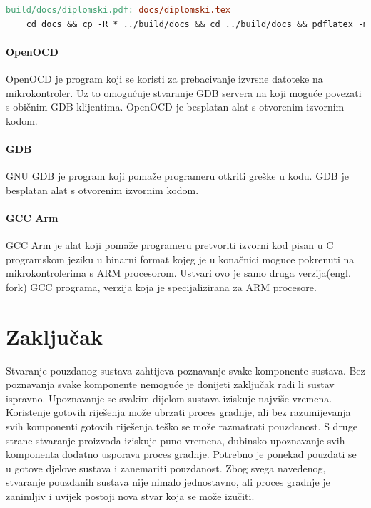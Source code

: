 \documentclass[times, utf8, diplomski]{diplomski}
\begin{document}
\begin{lstlisting}[language=make, label={lst:make}, caption={Gradnja dokumentacije korištenjem make recepta}]
build/docs/diplomski.pdf: docs/diplomski.tex
	cd docs && cp -R * ../build/docs && cd ../build/docs && pdflatex -mltex diplomski.tex && bibtex diplomski && pdflatex -mltex diplomski.tex
\end{lstlisting}

\subsubsection{OpenOCD}
OpenOCD \cite{openocd} je program koji se koristi za prebacivanje izvrsne datoteke na mikrokontroler. Uz to omogućuje stvaranje GDB servera na koji moguće povezati s običnim GDB klijentima. OpenOCD je besplatan alat s otvorenim izvornim kodom.

\subsubsection{GDB}
GNU GDB \cite{gdb} je program koji pomaže programeru otkriti greške u kodu. GDB je besplatan alat s otvorenim izvornim kodom.

\subsubsection{GCC Arm}
GCC Arm \cite{armgcc} je alat koji pomaže programeru pretvoriti izvorni kod pisan u C programskom jeziku u binarni format kojeg je u konačnici moguce pokrenuti na mikrokontrolerima s ARM procesorom. Ustvari ovo je samo druga verzija(engl. fork) GCC \cite{gcc} programa, verzija koja je specijalizirana za ARM procesore.

\chapter{Zaključak}
Stvaranje pouzdanog sustava zahtijeva poznavanje svake komponente sustava.
Bez poznavanja svake komponente nemoguće je donijeti zaključak radi li sustav ispravno.
Upoznavanje se svakim dijelom sustava iziskuje najviše vremena. Koristenje gotovih riješenja može ubrzati proces gradnje, ali bez razumijevanja svih komponenti gotovih riješenja teško se može razmatrati pouzdanost.
S druge strane stvaranje proizvoda iziskuje puno vremena, dubinsko upoznavanje svih komponenta dodatno usporava proces gradnje. Potrebno je ponekad pouzdati se u gotove djelove sustava i zanemariti pouzdanost. Zbog svega navedenog, stvaranje pouzdanih sustava nije nimalo jednostavno, ali proces gradnje je zanimljiv i uvijek postoji nova stvar koja se može izučiti.
\end{document}
